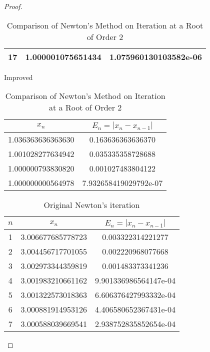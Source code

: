 \begin{enumerate}
\begin{proof}
\begin{table}[htbp]
\begin{subtable}[t]{.49\linewidth}
\begin{tabular}[t]{|c|c|c|}
			\footnotesize	17	&	\footnotesize	1.000001075651434	&	\footnotesize	1.075960130103582e-06	\\	\hline
			\end{tabular}
		\end{subtable}
		\begin{subtable}[t]{.49\linewidth}
			\centering
			\caption{Improved}
			\begin{tabular}{|c|c|}
				\hline
				\(x_n\)				&	\(E_n=|x_n-x_{n-1}|\)	\\	\hline
				\footnotesize	1.036363636363630	&	\footnotesize	0.163636363636370	\\	\hline
				\footnotesize	1.001028277634942	&	\footnotesize	0.035335358728688	\\	\hline
				\footnotesize	1.000000793830820	&	\footnotesize	0.001027483804122	\\	\hline
				\footnotesize	1.000000000564978	&	\footnotesize	7.932658419029792e-07	\\	\hline
			\end{tabular}
		\end{subtable}
		\caption{Comparison of Newton's Method on Iteration at a Root of Order 2}
		\label{newtoncompare2}
	\end{table}
	\begin{table}[htbp]
		\begin{subtable}[t]{.49\linewidth}
			\centering
			\caption{Original Newton's iteration}
			\begin{tabular}{|c|c|c|}
			\hline
			$n$	&	\(x_n\)				&	\(E_n=|x_n-x_{n-1}|\)	\\	\hline
			\footnotesize	1	&	\footnotesize	3.006677685778723	&	\footnotesize	0.003322314221277	\\	\hline
			\footnotesize	2	&	\footnotesize	3.004456717701055	&	\footnotesize	0.002220968077668	\\	\hline
			\footnotesize	3	&	\footnotesize	3.002973344359819	&	\footnotesize	0.001483373341236	\\	\hline
			\footnotesize	4	&	\footnotesize	3.001983210661162	&	\footnotesize	9.901336986564147e-04	\\	\hline
			\footnotesize	5	&	\footnotesize	3.001322573018363	&	\footnotesize	6.606376427993332e-04	\\	\hline
			\footnotesize	6	&	\footnotesize	3.000881914953126	&	\footnotesize	4.406580652367431e-04	\\	\hline
			\footnotesize	7	&	\footnotesize	3.000588039669541	&	\footnotesize	2.938752835852654e-04	\\	\hline

\end{tabular}
\end{subtable}
\end{table}
\end{proof}
\end{enumerate}

